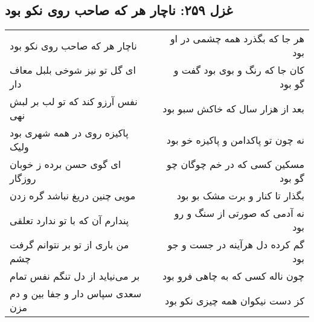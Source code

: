 \begin{center}
\section*{غزل ۲۵۹: ناچار هر که صاحب روی نکو بود}
\label{sec:259}
\begin{longtable}{l p{0.5cm} r}
ناچار هر که صاحب روی نکو بود
&&
هر جا که بگذرد همه چشمی در او بود
\\
ای گل تو نیز شوخی بلبل معاف دار
&&
کان جا که رنگ و بوی بود گفت و گو بود
\\
نفس آرزو کند که تو لب بر لبش نهی
&&
بعد از هزار سال که خاکش سبو بود
\\
پاکیزه روی در همه شهری بود ولیک
&&
نه چون تو پاکدامن و پاکیزه خو بود
\\
ای گوی حسن برده ز خوبان روزگار
&&
مسکین کسی که در خم چوگان چو گو بود
\\
مویی چنین دریغ نباشد گره زدن
&&
بگذار تا کنار و برت مشک بو بود
\\
پندارم آن که با تو ندارد تعلقی
&&
نه آدمی که صورتی از سنگ و رو بود
\\
من باری از تو بر نتوانم گرفت چشم
&&
گم کرده دل هرآینه در جست و جو بود
\\
بر می‌نیاید از دل تنگم نفس تمام
&&
چون ناله کسی که به چاهی فرو بود
\\
سعدی سپاس دار و جفا بین و دم مزن
&&
کز دست نیکوان همه چیزی نکو بود
\\
\end{longtable}
\end{center}
